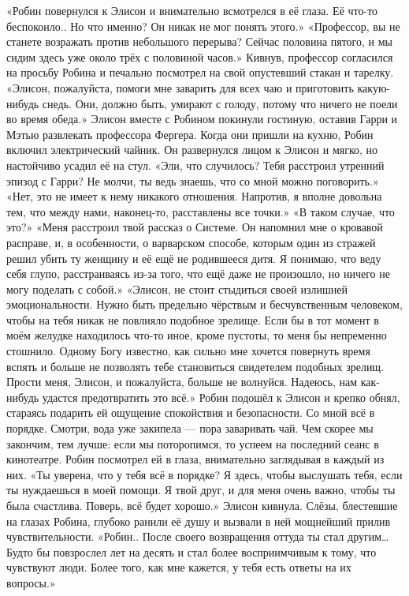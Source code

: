 \documentclass[a4paper,12pt]{book}
\begin{document}
	«Робин повернулся к Элисон и внимательно всмотрелся в её глаза. Её что-то беспокоило.. Но что именно? Он никак не мог понять этого.»
	«Профессор, вы не станете возражать против небольшого перерыва? Сейчас половина пятого, и мы сидим здесь уже около трёх с половиной часов.»
	Кивнув, профессор согласился на просьбу Робина и печально посмотрел на свой опустевший стакан и тарелку.
	«Элисон, пожалуйста, помоги мне заварить для всех чаю и приготовить какую-нибудь снедь. Они, должно быть, умирают с голоду, потому что ничего не поели во время обеда.»
	Элисон вместе с Робином покинули гостиную, оставив Гарри и Мэтью развлекать профессора Фергера.
	Когда они пришли на кухню, Робин включил электрический чайник. Он развернулся лицом к Элисон и мягко, но настойчиво усадил её на стул.
	«Эли, что случилось? Тебя расстроил утренний эпизод с Гарри? Не молчи, ты ведь знаешь, что со мной можно поговорить.»
	«Нет, это не имеет к нему никакого отношения. Напротив, я вполне довольна тем, что между нами, наконец-то, расставлены все точки.»
	«В таком случае, что это?»
	«Меня расстроил твой рассказ о Системе. Он напомнил мне о кровавой расправе, и, в особенности, о варварском способе, которым один из стражей решил убить ту женщину и её ещё не родившееся дитя. Я понимаю, что веду себя глупо, расстраиваясь из-за того, что ещё даже не произошло, но ничего не могу поделать с собой.»
	«Элисон, не стоит стыдиться своей излишней эмоциональности. Нужно быть предельно чёрствым и бесчувственным человеком, чтобы на тебя никак не повлияло подобное зрелище. Если бы в тот момент в моём желудке находилось что-то иное, кроме пустоты, то меня бы непременно стошнило. Одному Богу известно, как сильно мне хочется повернуть время вспять и больше не позволять тебе становиться свидетелем подобных зрелищ. Прости меня, Элисон, и пожалуйста, больше не волнуйся. Надеюсь, нам как-нибудь удастся предотвратить это всё.»
	Робин подошёл к Элисон и крепко обнял, стараясь подарить ей ощущение спокойствия и безопасности.
	Со мной всё в порядке. Смотри, вода уже закипела — пора заваривать чай. Чем скорее мы закончим, тем лучше: если мы поторопимся, то успеем на последний сеанс в кинотеатре.
	Робин посмотрел ей в глаза, внимательно заглядывая в каждый из них.
	«Ты уверена, что у тебя всё в порядке? Я здесь, чтобы выслушать тебя, если ты нуждаешься в моей помощи. Я твой друг, и для меня очень важно, чтобы ты была счастлива. Поверь, всё будет хорошо.»
	Элисон кивнула. Слёзы, блестевшие на глазах Робина, глубоко ранили её душу и вызвали в ней мощнейший прилив чувствительности.
	«Робин.. После своего возвращения оттуда ты стал другим… Будто бы повзрослел лет на десять и стал более восприимчивым к тому, что чувствуют люди. Более того, как мне кажется, у тебя есть ответы на их вопросы.»
\end{document}
